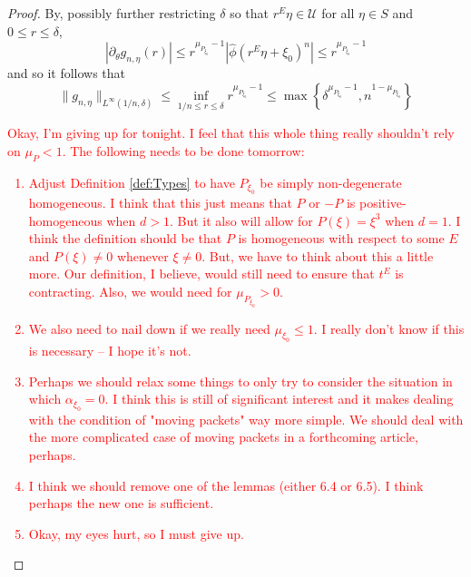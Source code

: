 \documentclass[11pt]{article}
\newcommand{\lc}{\left\{}
\newcommand{\rc}{\right\}}
\begin{document}
\begin{proof}
By, possibly further restricting $\delta$ so that $r^E\eta\in\mathcal{U}$ for all $\eta\in S$ and $0\leq r\leq \delta$, 
\begin{equation*}
    |\partial_\theta g_{n,\eta}(r)|\leq r^{\mu_{P_{\xi_0}}-1}|\widehat{\phi}(r^E\eta+\xi_0)^n|\leq r^{\mu_{P_{\xi_0}}-1}
\end{equation*}
and so it follows that
\begin{equation*}
    \| g_{n,\eta}\|_{L^\infty(1/n,\delta)}\leq \inf_{1/n\leq r\leq \delta}r^{\mu_{P_{\xi_0}}-1}\leq\max\lc\delta^{\mu_{P_{\xi_0}}-1},n^{1-\mu_{P_{\xi_0}}}\rc
\end{equation*}
\textcolor{red}{Okay, I'm giving up for tonight. I feel that this whole thing really shouldn't rely on $\mu_{P}<1$. The following needs to be done tomorrow:
\begin{enumerate}
    \item Adjust Definition \ref{def:Types} to have $P_{\xi_0}$ be simply non-degenerate homogeneous. I think that this just means that $P$ or $-P$ is positive-homogeneous when $d>1$. But it also will allow for $P(\xi)=\xi^3$ when $d=1$. I think the definition should be that $P$ is homogeneous with respect to some $E$ and $P(\xi)\neq 0$ whenever $\xi\neq 0$. But, we have to think about this a little more. Our definition, I believe, would still need to ensure that $t^E$ is contracting. Also, we would need for $\mu_{P_{\xi_0}}>0$. 
    \item We also need to nail down if we really need $\mu_{\xi_0}\leq 1$. I really don't know if this is necessary -- I hope it's not. 
    \item Perhaps we should relax some things to only try to consider the situation in which $\alpha_{\xi_0}=0$. I think this is still of significant interest and it makes dealing with the condition of "moving packets" way more simple. We should deal with the more complicated case of moving packets in a forthcoming article, perhaps.
    \item I think we should remove one of the lemmas (either 6.4 or 6.5). I think perhaps the new one is sufficient. 
    \item Okay, my eyes hurt, so I must give up.
\end{enumerate}}
\end{proof}
\end{document}
